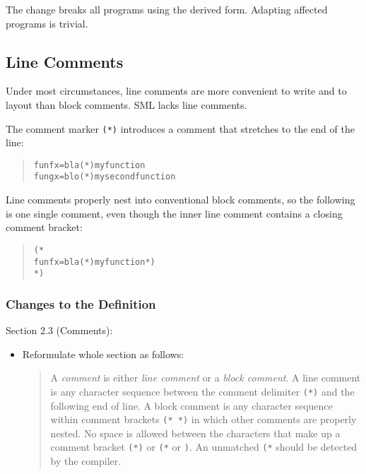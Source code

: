\documentclass[twoside,titlepage]{article}
\begin{document}
\begin{appendix}
The change breaks all programs using the derived form. Adapting affected programs is trivial.


\subsection{Line Comments}
\label{ext-linecomments}

Under most circumstances, line comments are more convenient to write and to layout than block comments. SML lacks line comments.

The comment marker {\tt (*)} introduces a comment that stretches to the end of the line:

\begin{quote}
\begin{alltt}
fun f x = bla    (*) my function
fun g x = blo    (*) my second function
\end{alltt}
\end{quote}

Line comments properly nest into conventional block comments, so the following is one single comment, even though the inner line comment contains a closing comment bracket:

\begin{quote}
\begin{alltt}
(*
fun f x = bla    (*) my function *)
*)
\end{alltt}
\end{quote}

\subsubsection*{Changes to the Definition}

Section 2.3 (Comments):
\begin{itemize}
\item Reformulate whole section as follows:
\begin{quote}
A \emph{comment} is either \emph{line comment} or a \emph{block comment}.
A line comment is any character sequence between the comment delimiter {\tt (*)} and the following end of line.
A block comment is any character sequence within comment brackets {\tt (* *)} in which other comments are properly nested.
No space is allowed between the characters that make up a comment bracket {\tt (*)} or {\tt (*} or {\tt *)}.
An unmatched {\tt (*} should be detected by the compiler.
\end{quote}
\end{itemize}


\end{appendix}
\end{document}
